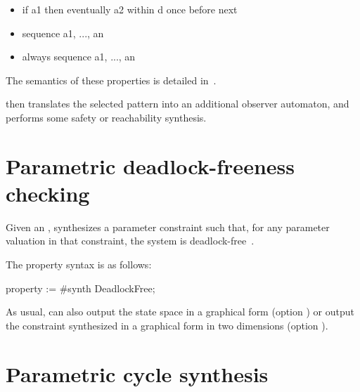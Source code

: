 \begin{itemize}
	\item
\begin{IMITATORproperty}
if a1 then eventually a2 within d once before next
\end{IMITATORproperty}

	\item
\begin{IMITATORproperty}
sequence a1, ..., an
\end{IMITATORproperty}

	\item
\begin{IMITATORproperty}
always sequence a1, ..., an
\end{IMITATORproperty}

\end{itemize}

The semantics of these properties is detailed in~\cite{Andre13ICECCS}.

\imitator{} then translates the selected pattern into an additional observer automaton, and performs some safety or reachability synthesis.


\section{Parametric deadlock-freeness checking}\label{ss:mode:PDFC}

Given an \NIPTA{}, \PDFC{} synthesizes a parameter constraint such that, for any parameter valuation in that constraint, the system is deadlock-free~\cite{Andre16}.

The property syntax is as follows:

\begin{IMITATORproperty}
property := #synth DeadlockFree;
\end{IMITATORproperty}

As usual, \imitator{} can also
output the state space in a graphical form (option )
or
output the constraint synthesized in a graphical form in two dimensions (option ).


\section{Parametric cycle synthesis}\label{ss:mode:LoopSynth}


